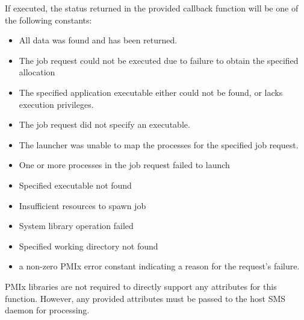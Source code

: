 \begin{arglist}
\end{arglist}

\returnsimplenb

If executed, the status returned in the provided callback function will be one of the following constants:

\begin{itemize}
\item {} All data was found and has been returned.
\item {} The job request could not be executed due to failure to obtain the specified allocation
\item {} The specified application executable either could not be found, or lacks execution privileges.
\item {} The job request did not specify an executable.
\item {} The launcher was unable to map the processes for the specified job request.
\item {} One or more processes in the job request failed to launch
\item {} Specified executable not found
\item {} Insufficient resources to spawn job
\item {} System library operation failed
\item {} Specified working directory not found
\item a non-zero \ac{PMIx} error constant indicating a reason for the request's failure.
\end{itemize}

\reqattrstart
\ac{PMIx} libraries are not required to directly support any attributes for this function. However, any provided attributes must be passed to the host \ac{SMS} daemon for processing.

